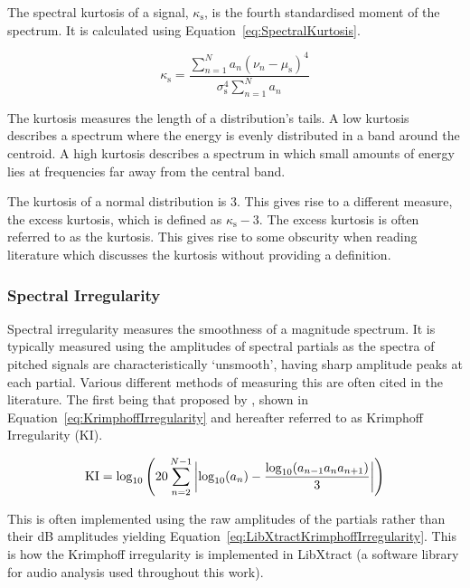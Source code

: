 			The spectral kurtosis of a signal, $\kappa_{\mathrm{s}}$, is the fourth standardised moment of the
			spectrum. It is calculated using Equation~\ref{eq:SpectralKurtosis}.

			\begin{equation}
				\kappa_{\mathrm{s}} = \frac{\sum_{n = 1}^{N} a_{n}(\nu_{n} - \mu_{\mathrm{s}})^{4}}
					{\sigma_{\mathrm{s}}^{4}\sum_{n = 1}^{N} a_{n}}
				\label{eq:SpectralKurtosis}
			\end{equation}

			The kurtosis measures the length of a distribution's tails. A low kurtosis describes a spectrum
			where the energy is evenly distributed in a band around the centroid. A high kurtosis describes a
			spectrum in which small amounts of energy lies at frequencies far away from the central band.

			The kurtosis of a normal distribution is 3. This gives rise to a different measure, the excess
			kurtosis, which is defined as $\kappa_{\mathrm{s}} - 3$. The excess kurtosis is often referred to
			as the kurtosis. This gives rise to some obscurity when reading literature which discusses the
			kurtosis without providing a definition.

		\subsubsection*{Spectral Irregularity}
			Spectral irregularity measures the smoothness of a magnitude spectrum. It is typically measured
			using the amplitudes of spectral partials as the spectra of pitched signals are characteristically
			`unsmooth', having sharp amplitude peaks at each partial. Various different methods of measuring
			this are often cited in the literature. The first being that proposed by
			\citet{krimphoff1994caracterisation}, shown in Equation~\ref{eq:KrimphoffIrregularity} and
			hereafter referred to as Krimphoff Irregularity ($\mathrm{KI}$).

			\begin{equation}
				\mathrm{KI} = \log_{10} \left( 20 \sum_{n = 2}^{N - 1}
						   \left|\log_{10}(a_{n}) - \frac{\log_{10}(a_{n-1}a_{n}a_{n+1})}{3}\right|
						   \right)
				\label{eq:KrimphoffIrregularity}
			\end{equation}

			This is often implemented using the raw amplitudes of the partials rather than their dB amplitudes
			yielding Equation~\ref{eq:LibXtractKrimphoffIrregularity}. This is how the Krimphoff irregularity
			is implemented in LibXtract \citep{bullock2007libxtract} (a software library for audio analysis
			used throughout this work).

